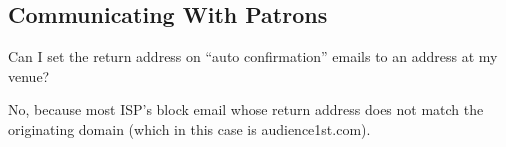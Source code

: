 \subsection{Communicating With Patrons}

\question 
Can I set the return address on ``auto confirmation'' emails
  to an address at my venue?

\answer 
No, because most ISP's block email whose return address does not
match the originating domain (which in this case is audience1st.com). 

